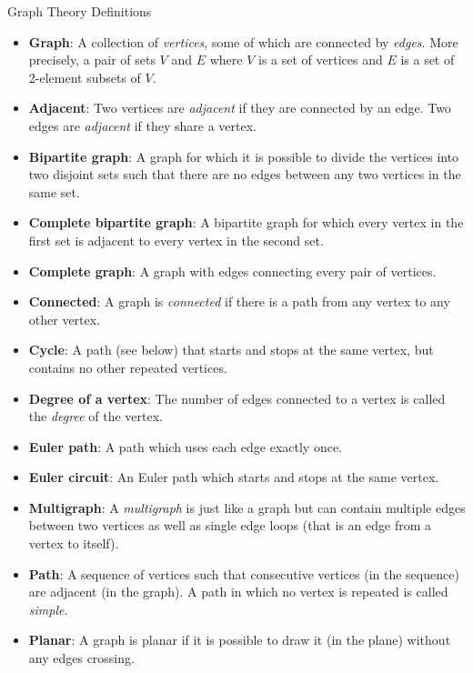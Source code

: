 \documentclass[12pt]{article}
\begin{document}
\begin{defbox}{Graph Theory Definitions}

  \begin{itemize}
    \item[] \textbf{Graph}: A collection of {\em vertices}, some of which are connected by {\em edges}.  More precisely, a pair of sets $V$ and $E$ where $V$ is a set of vertices and $E$ is a set of 2-element subsets of $V$.
    \item[] \textbf{Adjacent}: Two vertices are {\em adjacent} if they are connected by an edge.  Two edges are {\em adjacent} if they share a vertex.
    \item[] \textbf{Bipartite graph}: A graph for which it is possible to divide the vertices into two disjoint sets such that there are no edges between any two vertices in the same set.
    \item[] \textbf{Complete bipartite graph}: A bipartite graph for which every vertex in the first set is adjacent to every vertex in the second set.
    \item[] \textbf{Complete graph}: A graph with edges connecting every pair of vertices.
    \item[] \textbf{Connected}: A graph is {\em connected} if there is a path from any vertex to any other vertex.     
    \item[] \textbf{Cycle}: A path (see below) that starts and stops at the same vertex, but contains no other repeated vertices.
    \item[] \textbf{Degree of a vertex}: The number of edges connected to a vertex is called the {\em degree} of the vertex.
    \item[] \textbf{Euler path}: A path which uses each edge exactly once.
    \item[] \textbf{Euler circuit}: An Euler path which starts and stops at the same vertex. 
    \item[] \textbf{Multigraph}: A {\em multigraph} is just like a graph but can contain multiple edges between two vertices as well as single edge loops (that is an edge from a vertex to itself).
    \item[] \textbf{Path}: A sequence of vertices such that consecutive vertices (in the sequence) are adjacent (in the graph).  A path in which no vertex is repeated is called {\em simple}.
    \item[] \textbf{Planar}: A graph is planar if it is possible to draw it (in the plane) without any edges crossing.

\end{itemize}
\end{defbox}
\end{document}
